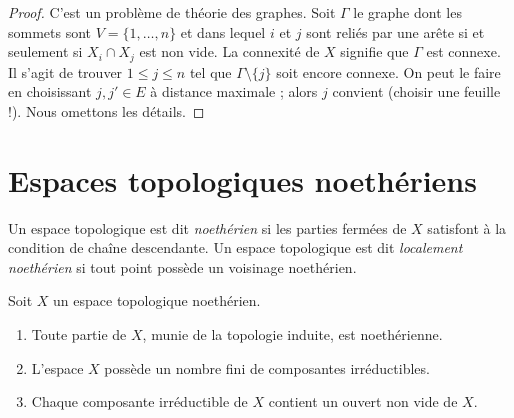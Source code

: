 \begin{proof}
C'est un problème de théorie des graphes. Soit $\Gamma$ le graphe dont les
sommets sont $V = \{1, \ldots, n\}$ et dans lequel $i$ et $j$ sont reliés par
une arête si et seulement si $X_i \cap X_j$ est non vide. La connexité de $X$
signifie que $\Gamma$ est connexe. Il s'agit de trouver
$1 \leq j \leq n$ tel que $\Gamma \setminus \{j\}$ soit encore connexe.
On peut le faire en choisissant $j, j' \in E$ à distance maximale ; alors $j$
convient (choisir une feuille !). Nous omettons les détails.
\end{proof}

\section{Espaces topologiques noethériens}
\label{section-noetherian}

\begin{definition}
\label{definition-noetherian}
Un espace topologique est dit {\it noethérien} si les parties fermées de $X$
satisfont à la condition de chaîne descendante. Un espace topologique est dit
{\it localement noethérien} si tout point possède un voisinage noethérien.
\end{definition}

\begin{lemma}
\label{lemma-Noetherian}
Soit $X$ un espace topologique noethérien.
\begin{enumerate}
\item Toute partie de $X$, munie de la topologie induite, est noethérienne.
\item L'espace $X$ possède un nombre fini de composantes irréductibles.
\item Chaque composante irréductible de $X$ contient un ouvert non vide de
$X$.
\end{enumerate}
\end{lemma}

